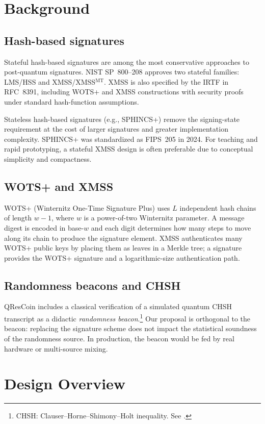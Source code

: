 \documentclass[11pt]{article}
\begin{document}
\section{Background}
\subsection{Hash-based signatures}
Stateful hash-based signatures are among the most conservative approaches to post-quantum signatures. NIST SP~800--208 approves two stateful families: LMS/HSS and XMSS/XMSS$^{\text{MT}}$.\cite{nist800208} XMSS is also specified by the IRTF in RFC~8391, including WOTS+ and XMSS constructions with security proofs under standard hash-function assumptions.\cite{rfc8391}

Stateless hash-based signatures (e.g., SPHINCS+) remove the signing-state requirement at the cost of larger signatures and greater implementation complexity. SPHINCS+ was standardized as FIPS~205 in 2024.\cite{fips205} For teaching and rapid prototyping, a stateful XMSS design is often preferable due to conceptual simplicity and compactness.

\subsection{WOTS+ and XMSS}
WOTS+ (Winternitz One-Time Signature Plus) uses $L$ independent hash chains of length $w{-}1$, where $w$ is a power-of-two Winternitz parameter.\cite{rfc8391} A message digest is encoded in base-$w$ and each digit determines how many steps to move along its chain to produce the signature element. XMSS authenticates many WOTS+ public keys by placing them as leaves in a Merkle tree; a signature provides the WOTS+ signature and a logarithmic-size authentication path.

\subsection{Randomness beacons and CHSH}
QResCoin includes a classical verification of a simulated quantum CHSH transcript as a didactic \emph{randomness beacon}.\footnote{CHSH: Clauser--Horne--Shimony--Holt inequality. See \cite{chsh1969}.} Our proposal is orthogonal to the beacon: replacing the signature scheme does not impact the statistical soundness of the randomness source. In production, the beacon would be fed by real hardware or multi-source mixing.

\section{Design Overview}
\end{document}
